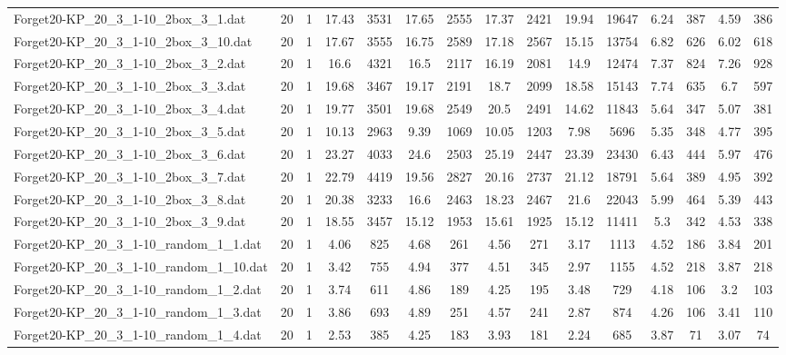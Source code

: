 \begin{table}[!ht]
{\begin{tabular}{lcccccccccccccc}
Forget20-KP\_20\_3\_1-10\_2box\_3\_1.dat & 20 & 1 & 17.43 & 3531 & 17.65 & 2555 & 17.37 & 2421 & 19.94 & 19647 & 6.24 & 387 & 4.59 & 386 \\
Forget20-KP\_20\_3\_1-10\_2box\_3\_10.dat & 20 & 1 & 17.67 & 3555 & 16.75 & 2589 & 17.18 & 2567 & 15.15 & 13754 & 6.82 & 626 & 6.02 & 618 \\
Forget20-KP\_20\_3\_1-10\_2box\_3\_2.dat & 20 & 1 & 16.6 & 4321 & 16.5 & 2117 & 16.19 & 2081 & 14.9 & 12474 & 7.37 & 824 & 7.26 & 928 \\
Forget20-KP\_20\_3\_1-10\_2box\_3\_3.dat & 20 & 1 & 19.68 & 3467 & 19.17 & 2191 & 18.7 & 2099 & 18.58 & 15143 & 7.74 & 635 & 6.7 & 597 \\
Forget20-KP\_20\_3\_1-10\_2box\_3\_4.dat & 20 & 1 & 19.77 & 3501 & 19.68 & 2549 & 20.5 & 2491 & 14.62 & 11843 & 5.64 & 347 & 5.07 & 381 \\
Forget20-KP\_20\_3\_1-10\_2box\_3\_5.dat & 20 & 1 & 10.13 & 2963 & 9.39 & 1069 & 10.05 & 1203 & 7.98 & 5696 & 5.35 & 348 & 4.77 & 395 \\
Forget20-KP\_20\_3\_1-10\_2box\_3\_6.dat & 20 & 1 & 23.27 & 4033 & 24.6 & 2503 & 25.19 & 2447 & 23.39 & 23430 & 6.43 & 444 & 5.97 & 476 \\
Forget20-KP\_20\_3\_1-10\_2box\_3\_7.dat & 20 & 1 & 22.79 & 4419 & 19.56 & 2827 & 20.16 & 2737 & 21.12 & 18791 & 5.64 & 389 & 4.95 & 392 \\
Forget20-KP\_20\_3\_1-10\_2box\_3\_8.dat & 20 & 1 & 20.38 & 3233 & 16.6 & 2463 & 18.23 & 2467 & 21.6 & 22043 & 5.99 & 464 & 5.39 & 443 \\
Forget20-KP\_20\_3\_1-10\_2box\_3\_9.dat & 20 & 1 & 18.55 & 3457 & 15.12 & 1953 & 15.61 & 1925 & 15.12 & 11411 & 5.3 & 342 & 4.53 & 338 \\
Forget20-KP\_20\_3\_1-10\_random\_1\_1.dat & 20 & 1 & 4.06 & 825 & 4.68 & 261 & 4.56 & 271 & 3.17 & 1113 & 4.52 & 186 & 3.84 & 201 \\
Forget20-KP\_20\_3\_1-10\_random\_1\_10.dat & 20 & 1 & 3.42 & 755 & 4.94 & 377 & 4.51 & 345 & 2.97 & 1155 & 4.52 & 218 & 3.87 & 218 \\
Forget20-KP\_20\_3\_1-10\_random\_1\_2.dat & 20 & 1 & 3.74 & 611 & 4.86 & 189 & 4.25 & 195 & 3.48 & 729 & 4.18 & 106 & 3.2 & 103 \\
Forget20-KP\_20\_3\_1-10\_random\_1\_3.dat & 20 & 1 & 3.86 & 693 & 4.89 & 251 & 4.57 & 241 & 2.87 & 874 & 4.26 & 106 & 3.41 & 110 \\
Forget20-KP\_20\_3\_1-10\_random\_1\_4.dat & 20 & 1 & 2.53 & 385 & 4.25 & 183 & 3.93 & 181 & 2.24 & 685 & 3.87 & 71 & 3.07 & 74 \\

\end{tabular}}
\end{table}
